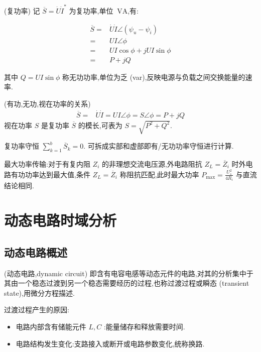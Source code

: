         \begin{definition}
            (复功率) 记 $\overline{S}=\dot{U}\dot{I}^{*}$ 为复功率,单位 $\ \mathrm{VA}$,有:
        
        \begin{align}
            \overline{S}=&\dot{U}\dot{I}\angle(\psi_{u}-\psi_{i})\nonumber\\
            =&UI\angle\phi\nonumber\\
            =&UI\cos\phi+jUI\sin\phi\nonumber\\
            =&P+jQ\nonumber
        \end{align}
        
        其中 $Q=UI\sin\phi$ 称无功功率,单位为乏 (var),反映电源与负载之间交换能量的速率.
        \end{definition}
        \begin{remark}
            (有功,无功,视在功率的关系) 
            \begin{align}
                \overline{S}=&\dot{U}\dot{I}=UI\angle\phi=S\angle\phi=P+jQ\nonumber
            \end{align}
            视在功率 $S$ 是复功率 $\overline{S}$ 的模长,可表为 $S=\sqrt{P^2+Q^2}$.
        \end{remark}
        复功率守恒 $\sum_{k=1}^{b}\overline{S}_{k}=0$. 可拆成实部和虚部即有/无功功率守恒进行计算.

        最大功率传输:对于有复内阻 $Z_{i}$ 的非理想交流电压源,外电路阻抗 $Z_{L}=\overline{Z}_{i}$ 时外电路有功功率达到最大值,条件 $Z_{L}=\overline{Z}_{i}$ 称阻抗匹配,此时最大功率 $P_{\mathrm{max}}=\frac{U_{s}^2}{4R_{i}}$ 与直流结论相同.
\section{动态电路时域分析}
    \subsection{动态电路概述}
        \begin{definition}
            (动态电路,dynamic circuit) 即含有电容电感等动态元件的电路,对其的分析集中于其由一个稳态过渡到另一个稳态需要经历的过程,也称过渡过程或瞬态 (transient state),用微分方程描述.
        \end{definition}
        
        过渡过程产生的原因:
        \begin{itemize}
            \item 电路内部含有储能元件 $L,C$ :能量储存和释放需要时间.
            \item 电路结构发生变化:支路接入或断开或电路参数变化,统称换路.
        \end{itemize}

